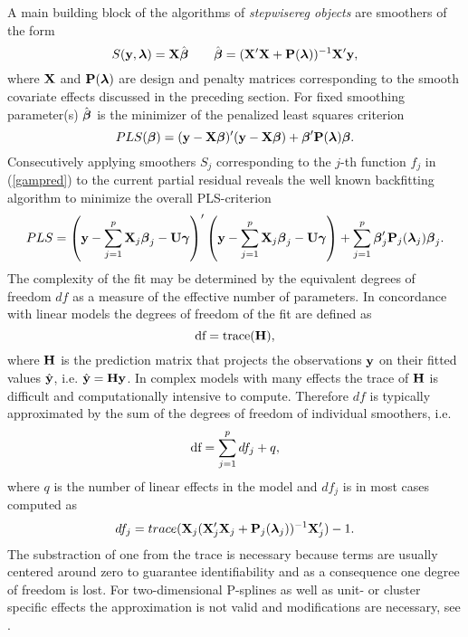 \documentclass[11pt,a4paper,twoside]{bayesxarticle}
\begin{document}
A main building block of the algorithms of {\em stepwisereg objects} are  smoothers of the form
$$
S(\mathbf{y},\boldsymbol{\lambda}) = \mathbf{X} \hat{\boldsymbol{\beta}} \qquad \hat{\boldsymbol{\beta}} = (\mathbf{X}'\mathbf{X} + \mathbf{P}(\boldsymbol{\lambda}))^{-1}\mathbf{X}' \mathbf{y},
$$
where $\mathbf{X}$ and $\mathbf{P}(\boldsymbol{\lambda})$ are design and penalty matrices corresponding to
the smooth covariate effects discussed in the preceding section.
For fixed smoothing parameter(s) $\hat{\boldsymbol{\beta}}$ is the minimizer of the penalized least squares criterion
$$
PLS(\boldsymbol{\beta}) = (\mathbf{y}-\mathbf{X} \boldsymbol{\beta})' (\mathbf{y}-\mathbf{X} \boldsymbol{\beta}) + \boldsymbol{\beta}' \mathbf{P}(\boldsymbol{\lambda}) \boldsymbol{\beta}.
$$
Consecutively applying smoothers $S_j$ corresponding to the $j$-th function $f_j$ in (\ref{gampred}) to
the current partial residual reveals the well known backfitting
algorithm to minimize the overall PLS-criterion
$$
PLS = \left(\mathbf{y}-\sum_{j=1}^{p}\mathbf{X}_j \boldsymbol{\beta}_j  - \mathbf{U} \boldsymbol{\gamma} \right)'
\left(\mathbf{y}-\sum_{j=1}^{p}\mathbf{X}_j \boldsymbol{\beta}_j - \mathbf{U} \boldsymbol{\gamma}  \right) +
\sum_{j=1}^{p} \boldsymbol{\beta}_j' \mathbf{P}_j(\boldsymbol{\lambda}_j) \boldsymbol{\beta}_j.
$$
The complexity of the fit may be determined by the equivalent degrees of freedom $df$ as a measure of the effective number of parameters.
In concordance with linear models the degrees of freedom of the fit are defined as
$$
\mbox{df} = \mbox{trace} (\mathbf{H}),
$$
where $\mathbf{H}$ is the prediction matrix that projects the observations $\mathbf{y}$ on their fitted values $\hat{\mathbf{y}}$, i.e.
$\hat {\mathbf{y}} = \mathbf{H} \mathbf{y}$. In complex models with many effects the trace of $\mathbf{H}$ is difficult and computationally intensive to compute.
Therefore $df$ is typically approximated by the sum of the degrees of freedom of individual smoothers, i.e.
$$
\mbox{df} = \sum_{j=1}^{p} df_j + q,
$$
where $q$ is the number of linear effects in the model and  $df_j$ is in most cases computed as
\begin{equation}
\label{df_approx}
df_j = trace (\Xvec_j (\Xvec_j'\Xvec_j + \Pvec_j(\lambdavec_j))^{-1}\Xvec_j')-1.
\end{equation}
The substraction of one from the trace is necessary because terms are usually centered around zero to guarantee identifiability
and as a consequence one degree of freedom is lost. For two-dimensional P-splines as well as unit- or cluster specific effects
the approximation is not valid and modifications are necessary, see .
\end{document}

